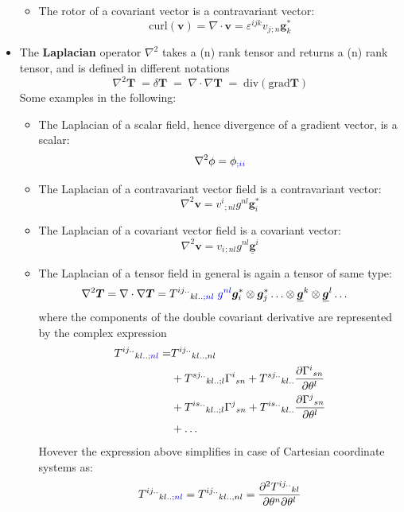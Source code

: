 \documentclass{digitaldynamics}
\def\vect#1{\bm{#1}}
\def\vcovar#1{{\bm{#1}}^*}
\def\vcontr#1{\underline{\bm{#1}}}
\def\tensor#1{\bm{#1}}
\begin{document}
\begin{itemize}
\begin{itemize}
		\item The rotor of a covariant vector is a contravariant vector: 
		\[
				 \mathrm{curl}(\vect{v}) = \nabla \cdot \vect{v}
				   = \varepsilon^{ijk} v_j{}_{;n} \vcovar{g}_k
		\]
		
	\end{itemize}
	
	
	
	
	\item The \textbf{Laplacian} operator $\nabla^2$ takes a (n) rank tensor and returns a (n) rank tensor,
	and is defined in different notations 
	\[
		\nabla^2 \tensor{T} \; = \delta \tensor{T} \; = \; \nabla \cdot \nabla \tensor{T} \; = \; \mathrm{div} (\mathrm{grad} \tensor{T})
	\]
	Some examples in the following:
	
	\begin{itemize}
		\item The Laplacian of a scalar field, hence divergence of a gradient vector, is a scalar:
		\[
				  \nabla^2 \phi = \phi_{\textcolor{blue}{;ii}}
		\]
	
		\item The Laplacian of a contravariant vector field is a contravariant vector: 
		\[
				 \nabla^2  \vect{v} = v^i{}_{;nl} g^{nl} \vcovar{g}_i
		\]
		
		\item The Laplacian of a covariant vector field is a covariant vector:
		\[
				 \nabla^2  \vect{v} = v_i{}_{;nl} g^{nl} \vcontr{g}^i
		\]
		
		\item The Laplacian of a tensor field in general is again a tensor of same type:
		\begin{align}
					\nabla^2 \tensor{T} = \nabla \cdot \nabla \tensor{T}  
					&= T^{ij..}{}_{kl.. \textcolor{blue}{;nl}} \; \textcolor{blue}{g^{nl}} \vcovar{g}_i \otimes \vcovar{g}_j \ldots \otimes \vcontr{g}^k \otimes \vcontr{g}^l \ldots 
		\end{align}
		where the components of the double covariant derivative are represented by the complex expression
		\begin{align}
		T^{ij..}{}_{kl.. \textcolor{blue}{;nl}} =& T^{ij..}{}_{kl.. ,nl}  \\
	 &+ T^{sj..}{}_{kl..;l} {\Gamma^i}_{sn} + T^{sj..}{}_{kl..} \frac{\partial{\Gamma^i}_{sn}}{\partial \theta^l} \\
	 &+ T^{is..}{}_{kl..;l} {\Gamma^j}_{sn} + T^{is..}{}_{kl..} \frac{\partial{\Gamma^j}_{sn}}{\partial \theta^l} \\
	 &+ \ldots 
		\end{align}
		Hovever the expression above simplifies in case of Cartesian coordinate systems as:
		\[
		T^{ij..}{}_{kl.. \textcolor{blue}{;nl}}  = T^{ij..}{}_{kl.. ,nl}  = \frac{\partial^2 T^{ij..}{}_{kl}}{\partial \theta^n \partial \theta^l}
		\]
	\end{itemize}
	
\end{itemize}
\end{document}
